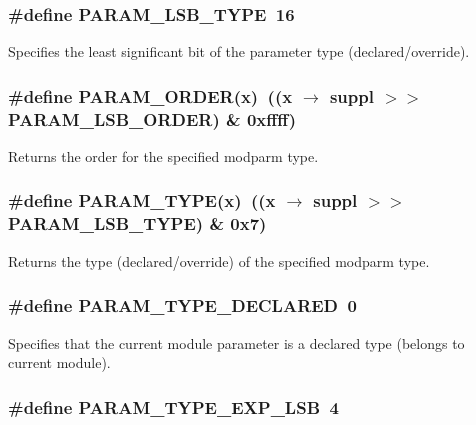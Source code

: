\subsubsection{\setlength{\rightskip}{0pt plus 5cm}\#define PARAM\_\-LSB\_\-TYPE\ 16}\label{group__param__suppl_a1}


Specifies the least significant bit of the parameter type (declared/override). 
\subsubsection{\setlength{\rightskip}{0pt plus 5cm}\#define PARAM\_\-ORDER(x)\ ((x $\rightarrow$ suppl $>$$>$ PARAM\_\-LSB\_\-ORDER) \& 0xffff)}\label{group__param__suppl_a8}


Returns the order for the specified modparm type. 
\subsubsection{\setlength{\rightskip}{0pt plus 5cm}\#define PARAM\_\-TYPE(x)\ ((x $\rightarrow$ suppl $>$$>$ PARAM\_\-LSB\_\-TYPE) \& 0x7)}\label{group__param__suppl_a9}


Returns the type (declared/override) of the specified modparm type. 
\subsubsection{\setlength{\rightskip}{0pt plus 5cm}\#define PARAM\_\-TYPE\_\-DECLARED\ 0}\label{group__param__suppl_a2}


Specifies that the current module parameter is a declared type (belongs to current  module). 
\subsubsection{\setlength{\rightskip}{0pt plus 5cm}\#define PARAM\_\-TYPE\_\-EXP\_\-LSB\ 4}\label{group__param__suppl_a6}


